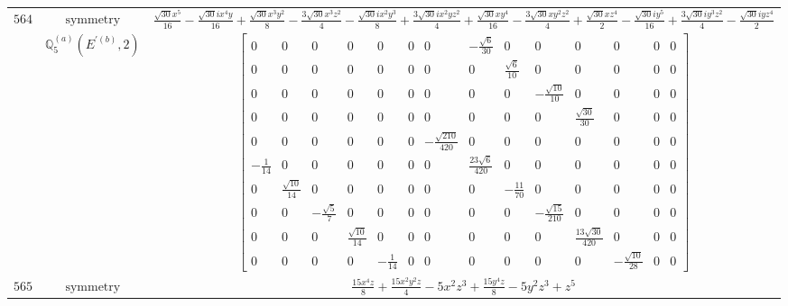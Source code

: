 \documentclass[fleqn,8pt,landscape]{jsarticle}
\begin{document}
\begin{longtable}{ccc}
$ 564 $ & $ \text{symmetry} $ & $ \frac{\sqrt{30} x^{5}}{16} - \frac{\sqrt{30} i x^{4} y}{16} + \frac{\sqrt{30} x^{3} y^{2}}{8} - \frac{3 \sqrt{30} x^{3} z^{2}}{4} - \frac{\sqrt{30} i x^{2} y^{3}}{8} + \frac{3 \sqrt{30} i x^{2} y z^{2}}{4} + \frac{\sqrt{30} x y^{4}}{16} - \frac{3 \sqrt{30} x y^{2} z^{2}}{4} + \frac{\sqrt{30} x z^{4}}{2} - \frac{\sqrt{30} i y^{5}}{16} + \frac{3 \sqrt{30} i y^{3} z^{2}}{4} - \frac{\sqrt{30} i y z^{4}}{2} $ \\
$  $ & $ \mathbb{Q}_{5}^{(a)}(E^{\prime(b)},2) $ & $ \begin{bmatrix} 0 & 0 & 0 & 0 & 0 & 0 & 0 & - \frac{\sqrt{6}}{30} & 0 & 0 & 0 & 0 & 0 & 0 \\ 0 & 0 & 0 & 0 & 0 & 0 & 0 & 0 & \frac{\sqrt{6}}{10} & 0 & 0 & 0 & 0 & 0 \\ 0 & 0 & 0 & 0 & 0 & 0 & 0 & 0 & 0 & - \frac{\sqrt{10}}{10} & 0 & 0 & 0 & 0 \\ 0 & 0 & 0 & 0 & 0 & 0 & 0 & 0 & 0 & 0 & \frac{\sqrt{30}}{30} & 0 & 0 & 0 \\ 0 & 0 & 0 & 0 & 0 & 0 & - \frac{\sqrt{210}}{420} & 0 & 0 & 0 & 0 & 0 & 0 & 0 \\ - \frac{1}{14} & 0 & 0 & 0 & 0 & 0 & 0 & \frac{23 \sqrt{6}}{420} & 0 & 0 & 0 & 0 & 0 & 0 \\ 0 & \frac{\sqrt{10}}{14} & 0 & 0 & 0 & 0 & 0 & 0 & - \frac{11}{70} & 0 & 0 & 0 & 0 & 0 \\ 0 & 0 & - \frac{\sqrt{5}}{7} & 0 & 0 & 0 & 0 & 0 & 0 & - \frac{\sqrt{15}}{210} & 0 & 0 & 0 & 0 \\ 0 & 0 & 0 & \frac{\sqrt{10}}{14} & 0 & 0 & 0 & 0 & 0 & 0 & \frac{13 \sqrt{30}}{420} & 0 & 0 & 0 \\ 0 & 0 & 0 & 0 & - \frac{1}{14} & 0 & 0 & 0 & 0 & 0 & 0 & - \frac{\sqrt{10}}{28} & 0 & 0 \end{bmatrix} $ \\ \hline
$ 565 $ & $ \text{symmetry} $ & $ \frac{15 x^{4} z}{8} + \frac{15 x^{2} y^{2} z}{4} - 5 x^{2} z^{3} + \frac{15 y^{4} z}{8} - 5 y^{2} z^{3} + z^{5} $ \\

\end{longtable}
\end{document}
